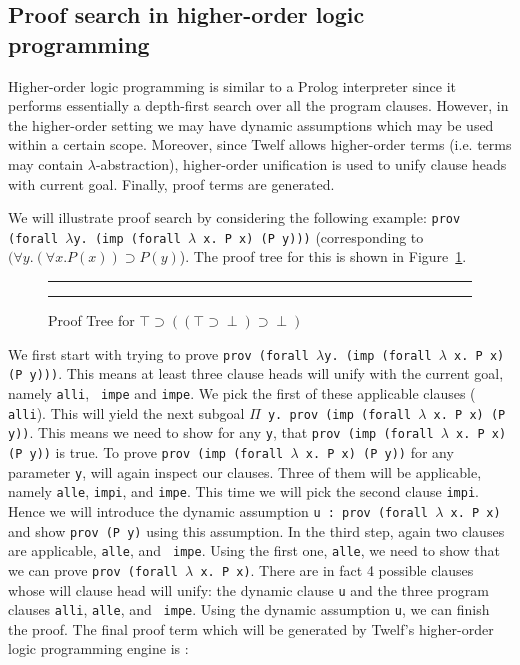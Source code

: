 \documentclass{acmconf}
\newcommand{\figfoot}{\vspace{1ex}\hrule}
\newcommand{\fighead}{\hrule\vspace{1.5ex}}
\newcommand{\impl}{\supset}
\begin{document}
\subsection{Proof search in higher-order logic programming}

Higher-order logic programming is similar to a Prolog interpreter
since it performs essentially a depth-first search over all the
program clauses. However, in the higher-order setting we may have
dynamic assumptions which may be used within a certain
scope. Moreover, since Twelf allows higher-order terms (i.e. terms may
contain $\lambda$-abstraction), higher-order unification is used to
unify clause heads with current goal. Finally, proof terms are
generated.

We will illustrate proof search by considering the following example: {\tt prov (forall $\lambda$y. (imp (forall $\lambda$ x. P x) (P y)))}
(corresponding to $(\forall y. (\forall x.P(x)) \impl P(y)$).  The
proof tree for this is shown in Figure~\ref{prooftree1}.

\begin{figure}
\fighead
{}
\caption{\label{prooftree1} Proof Tree for 
$\top\impl((\top\impl\perp)\impl\perp)$}
\figfoot
\end{figure}
      
We first start with trying to prove {\tt prov (forall $\lambda$y. (imp
  (forall $\lambda$ x. P x) (P y)))}. This means at least three
clause heads will unify with the current goal, namely {\tt alli}, {\tt
  impe} and {\tt impe}. We pick the first of these applicable clauses ({\tt
alli}). This will yield the next subgoal {\tt $\Pi$ y. prov (imp
(forall $\lambda$ x. P x) (P y))}. This means we need to show for any
{\tt y}, that {\tt prov (imp (forall $\lambda$ x. P x) (P y))} is true.
To prove {\tt prov (imp (forall $\lambda$ x. P x) (P y))} for any
parameter {\tt y}, will again inspect our clauses. Three of them will
be applicable, namely {\tt alle}, {\tt impi}, and {\tt impe}. This
time we will pick the second clause {\tt impi}. Hence we will
introduce the dynamic assumption {\tt u : prov (forall $\lambda$ x. P x)}
and show {\tt prov (P y)} using this assumption. In the third step,
again two clauses are applicable,  {\tt alle}, and {\tt
  impe}. Using the first one, {\tt alle}, we need to show that we can
prove {\tt prov (forall $\lambda$ x. P x)}. There are in fact 4
possible clauses whose will clause head will unify: the dynamic clause
{\tt u} and the three program clauses {\tt alli}, {\tt alle}, and {\tt
  impe}. Using 
the dynamic assumption {\tt u}, we can finish the proof. The final
proof term which will be generated by Twelf's higher-order logic
programming engine is : 
\end{document}
